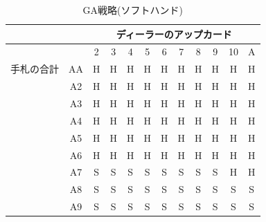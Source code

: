   \begin{table}[htbp]
    \centering
    \caption{GA戦略(ソフトハンド)\label{gastrategysoft}}
    \begin{tabular}{|c|c|c|c|c|c|c|c|c|c|c|c|}
      \hline
      \multicolumn{2}{|c|}{} & \multicolumn{10}{|c|}{ディーラーのアップカード} \\ \hline
      \multicolumn{2}{|c|}{} & 2 & 3 & 4 & 5 & 6 & 7 & 8 & 9 & 10 & A \\ \hline
      手札の合計 & AA & H & H & H & H & H & H & H & H & H & H \\ \cline{3-12}
                & A2 & H & H & H & H & H & H & H & H & H & H \\ \cline{3-12}
                & A3 & H & H & H & H & H & H & H & H & H & H \\ \cline{3-12}
                & A4 & H & H & H & H & H & H & H & H & H & H \\ \cline{3-12}
                & A5 & H & H & H & H & H & H & H & H & H & H \\ \cline{3-12}
                & A6 & H & H & H & H & H & H & H & H & H & H \\ \cline{3-12}
                & A7 & S & S & S & S & S & S & S & S & H & H \\ \cline{3-12}
                & A8 & S & S & S & S & S & S & S & S & S & S \\ \cline{3-12}
                & A9 & S & S & S & S & S & S & S & S & S & S \\ \hline
    \end{tabular}
  \end{table}


